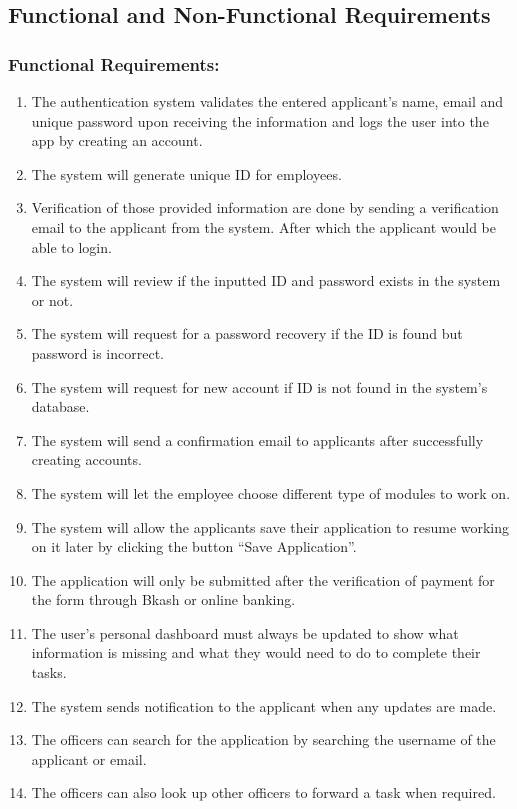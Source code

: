 \subsection{Functional and Non-Functional Requirements}
\subsubsection{Functional Requirements:}

\begin{enumerate}

\item The authentication system validates the entered applicant’s name, email and unique password upon receiving the information and logs the user into the app by creating an account.
\item The system will generate unique ID for employees.
\item Verification of those provided information are done by sending a verification email to the applicant from the system. After which the applicant would be able to login.
\item The system will review if the inputted ID and password exists in the system or not.
\item The system will request for a password recovery if the ID is found but password is incorrect.
\item The system will request for new account if ID is not found in the system’s database.
\item The system will send a confirmation email to applicants after successfully creating accounts.
\item The system will let the employee choose different type of modules to work on.
\item The system will allow the applicants save their application to resume working on it later by clicking the button “Save Application”.
\item The application will only be submitted after the verification of payment for the form through Bkash or online banking.
\item The user’s personal dashboard must always be updated to show what information is missing and what they would need to do to complete their tasks. 
\item The system sends notification to the applicant when any updates are made.
\item The officers can search for the application by searching the username of the applicant or email.
\item The officers can also look up other officers to forward a task when required.

\end{enumerate}
